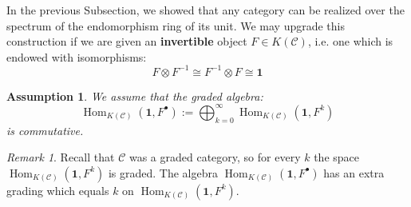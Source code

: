 \documentclass[12pt]{amsart}
\numberwithin{equation}{section}
\newtheorem{assumption}[theorem]{Assumption}
\theoremstyle{definition}
\theoremstyle{remark}
\newtheorem{remark}[theorem]{Remark}
\DeclareMathOperator{\Hom}{Hom}
\newcommand{\cat}{\mathcal{C}}
\renewcommand{\1}{\mathbf{1}}
\begin{document}
In the previous Subsection, we showed that any category can be realized over the spectrum of the endomorphism ring of its unit. We may upgrade this construction if we are given an \textbf{invertible} object $F \in K(\cat)$, i.e. one which is endowed with isomorphisms:
\begin{equation}
\label{eqn:def invertible}
F \otimes F^{-1} \cong F^{-1} \otimes F \cong \1
\end{equation}

\begin{assumption}
\label{ass:commute}
We assume that the graded algebra:
\begin{equation}
\label{eqn:commalg}
\Hom_{K(\cat)}(\1,F^{\bullet}) := \bigoplus_{k=0}^\infty \Hom_{K(\cat)}(\1,F^k)
\end{equation}
is commutative. %
\end{assumption}

\begin{remark}
Recall that $\cat$ was a graded category, so for every $k$ the space $\Hom_{K(\cat)}(\1,F^k)$ is graded. 
The algebra $\Hom_{K(\cat)}(\1,F^{\bullet})$ has an extra grading which equals $k$ on $\Hom_{K(\cat)}(\1,F^k)$.
\end{remark}
\end{document}
